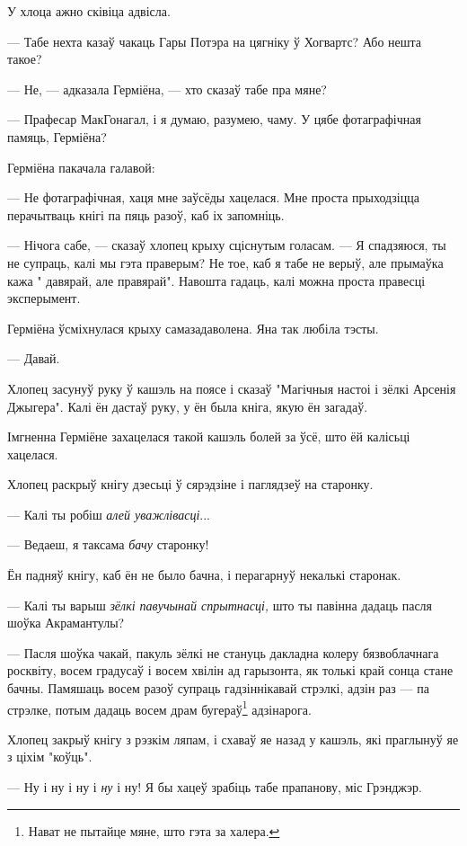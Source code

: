 У хлоца ажно сківіца адвісла. 

--- Табе нехта казаў чакаць Гары Потэра на цягніку ў Хогвартс? Або нешта такое?

--- Не, --- адказала Герміёна, --- хто сказаў табе пра мяне?

--- Прафесар МакГонагал, і я думаю, разумею, чаму. У цябе фотаграфічная памяць, Герміёна?

Герміёна пакачала галавой:

--- Не фотаграфічная, хаця мне заўсёды хацелася. Мне проста прыходзіцца перачытваць
кнігі па пяць разоў, каб іх запомніць.

--- Нічога сабе, --- сказаў хлопец крыху сціснутым голасам. --- Я спадзяюся, 
ты не супраць, калі мы гэта праверым? Не тое, каб я табе не верыў, 
але прымаўка кажа " давярай, але правярай". Навошта гадаць, калі можна проста 
правесці эксперымент.

Герміёна ўсміхнулася крыху самазадаволена. Яна так любіла тэсты. 

--- Давай.

Хлопец засунуў руку ў кашэль на поясе і сказаў "Магічныя настоі і зёлкі Арсенія Джыгера".
Калі ён дастаў руку, у ён была кніга, якую ён загадаў.

Імгненна Герміёне захацелася такой кашэль болей за ўсё, што ёй калісьці хацелася.

Хлопец раскрыў кнігу дзесьці ў сярэдзіне і паглядзеў на старонку. 

--- Калі ты робіш \emph{алей уважлівасці}...

--- Ведаеш, я таксама \emph{бачу} старонку!

Ён падняў кнігу, каб ён не было бачна, і перагарнуў некалькі старонак. 

--- Калі ты варыш \emph{зёлкі павучынай спрытнасці,} што ты павінна дадаць пасля 
шоўка Акрамантулы?

--- Пасля шоўка чакай, пакуль зёлкі не стануць дакладна колеру 
бязвоблачнага росквіту, восем градусаў і восем хвілін ад гарызонта, як толькі 
край сонца стане бачны. Памяшаць восем разоў супраць гадзіннікавай стрэлкі, 
адзін раз --- па стрэлке, потым дадаць восем драм бугераў\footnote{{}Нават не пытайце мяне,
што гэта за халера.} адзінарога. 

Хлопец закрыў кнігу з рэзкім ляпам, і схаваў яе назад у кашэль, які праглынуў 
яе з ціхім "коўць". 

--- Ну і ну і ну і \emph{ну} і ну! Я бы хацеў зрабіць табе прапанову, міс Грэнджэр.

